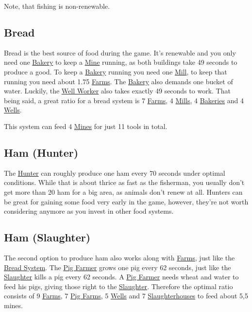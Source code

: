 \documentclass[12pt]{article}
\begin{document}
Note, that fishing is non-renewable.

\subsection{Bread}
\label{sec:bread}

Bread is the best source of food during the game. It's renewable and you only need one \hyperref[sec:bakery]{Bakery} to keep a \hyperref[sec:mine]{Mine} running, as both buildings take 49 seconds to produce a good. To keep a \hyperref[sec:bakery]{Bakery} running you need one \hyperref[sec:mill]{Mill}, to keep that running you need about 1.75 \hyperref[sec:farm]{Farms}. The \hyperref[sec:bakery]{Bakery} also demands one bucket of water. Luckily, the \hyperref[sec:well]{Well Worker} also takes exactly 49 seconds to work. That being said, a great ratio for a bread system is 7 \hyperref[sec:farm]{Farms}, 4 \hyperref[sec:mill]{Mills}, 4 \hyperref[sec:bakery]{Bakeries} and 4 \hyperref[sec:well]{Wells}.

This system can feed 4 \hyperref[sec:mine]{Mines} for just 11 tools in total.

\subsection{Ham (Hunter)}
\label{sec:hamhunter}

The  \hyperref[sec:hunter]{Hunter} can roughly produce one ham every 70 seconds under optimal conditions. While that is about thrice as fast as the fisherman, you usually don't get more than 20 ham for a big area, as animals don't renew at all. Hunters can be great for gaining some food very early in the game, however, they're not worth considering anymore as you invest in other food systems.

\subsection{Ham (Slaughter)}
\label{sec:hamslaughter}

The second option to produce ham also works along with \hyperref[sec:farm]{Farms}, just like the \hyperref[sec:bread]{Bread System}. The \hyperref[sec:pigfarm]{Pig Farmer} grows one pig every 62 seconds, just like the \hyperref[sec:slaughterhouse]{Slaughter} kills a pig every 62 seconds. A \hyperref[sec:pigfarm]{Pig Farmer} needs wheat and water to feed his pigs, giving those right to the \hyperref[sec:slaughterhouse]{Slaughter}. Therefore the optimal ratio consists of 9 \hyperref[sec:farm]{Farms}, 7 \hyperref[sec:pigfarm]{Pig Farms}, 5 \hyperref[sec:well]{Wells} and 7 \hyperref[sec:slaughterhouse]{Slaughterhouses} to feed about 5,5 mines.
\end{document}
